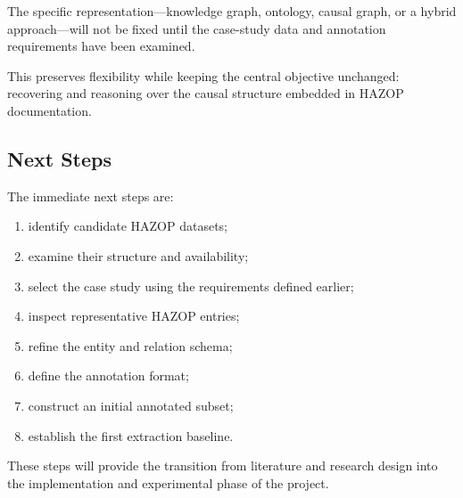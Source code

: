 The specific representation---knowledge graph, ontology, causal graph,
or a hybrid approach---will not be fixed until the case-study data and
annotation requirements have been examined.

This preserves flexibility while keeping the central objective
unchanged: recovering and reasoning over the causal structure embedded
in HAZOP documentation.

\subsection{Next Steps}

The immediate next steps are:

\begin{enumerate}[label=\textbf{\arabic*.}]
    \item identify candidate HAZOP datasets;
    \item examine their structure and availability;
    \item select the case study using the requirements defined earlier;
    \item inspect representative HAZOP entries;
    \item refine the entity and relation schema;
    \item define the annotation format;
    \item construct an initial annotated subset;
    \item establish the first extraction baseline.
\end{enumerate}

These steps will provide the transition from literature and research
design into the implementation and experimental phase of the project.
